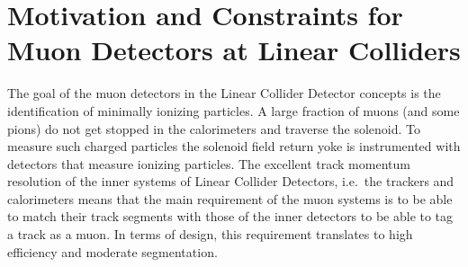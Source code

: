 \section{Motivation and Constraints for Muon Detectors at Linear Colliders}

The goal of the muon detectors in the Linear Collider Detector concepts is the identification of minimally ionizing particles. A large fraction of muons (and some pions) do not get stopped in the calorimeters and traverse the solenoid. To measure such charged particles the solenoid field return yoke is instrumented with detectors that measure ionizing particles. The excellent track momentum resolution of the inner systems of Linear Collider Detectors, i.e.\ the trackers and calorimeters means that the main requirement of the muon systems is to be able to match their track segments with those of the inner detectors to be able to tag a track as a muon. In terms of design, this requirement translates to high efficiency and moderate segmentation.
